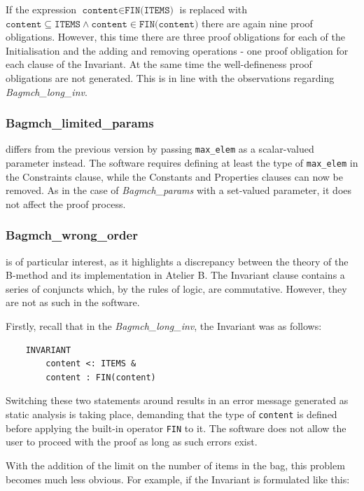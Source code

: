 \documentclass[12pt,journal,duplex]{IEEEtran}
\begin{document}
	If the expression $\texttt{content} \in \texttt{FIN(ITEMS)}$ is replaced with $\texttt{content} \subseteq \texttt{ITEMS} \wedge \texttt{content} \in \texttt{FIN(content)}$ there are again nine proof obligations. However, this time there are three proof obligations for each of the Initialisation and the adding and removing operations - one proof obligation for each clause of the Invariant. At the same time the well-defineness proof obligations are not generated. This is in line with the observations regarding \emph{Bagmch\_long\_inv}.

	\subsubsection{Bagmch\_limited\_params} differs from the previous version by passing \texttt{max\_elem} as a scalar-valued parameter instead. The software requires defining at least the type of \texttt{max\_elem} in the Constraints clause, while the Constants and Properties clauses can now be removed. As in the case of \emph{Bagmch\_params} with a set-valued parameter, it does not affect the proof process.

	\subsubsection{Bagmch\_wrong\_order} is of particular interest, as it highlights a discrepancy between the theory of the B-method and its implementation in Atelier B. The Invariant clause contains a series of conjuncts which, by the rules of logic, are commutative. However, they are not as such in the software.

	Firstly, recall that in the \emph{Bagmch\_long\_inv}, the Invariant was as follows:

	\begin{lstlisting}
	INVARIANT
		content <: ITEMS &
		content : FIN(content)
	\end{lstlisting}

	Switching these two statements around results in an error message generated as static analysis is taking place, demanding that the type of \texttt{content} is defined before applying the built-in operator \texttt{FIN} to it. The software does not allow the user to proceed with the proof as long as such errors exist.

	With the addition of the limit on the number of items in the bag, this problem becomes much less obvious. For example, if the Invariant is formulated like this:
\end{document}
